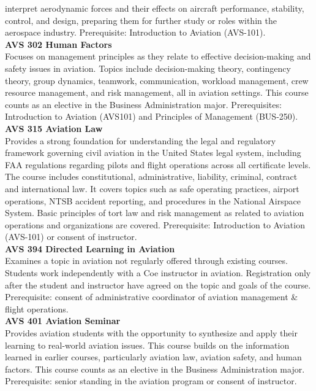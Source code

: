 \documentclass[
  letterpaper,
]{scrbook}
\begin{document}
interpret aerodynamic forces and their effects on aircraft performance,
stability, control, and design, preparing them for further study or
roles within the aerospace industry. Prerequisite: Introduction to
Aviation (AVS-101).\\
\textbf{AVS 302 Human Factors}\\
Focuses on management principles as they relate to effective
decision-making and safety issues in aviation. Topics include
decision-making theory, contingency theory, group dynamics, teamwork,
communication, workload management, crew resource management, and risk
management, all in aviation settings. This course counts as an elective
in the Business Administration major. Prerequisites: Introduction to
Aviation (AVS101) and Principles of Management (BUS-250).\\
\textbf{AVS 315 Aviation Law}\\
Provides a strong foundation for understanding the legal and regulatory
framework governing civil aviation in the United States legal system,
including FAA regulations regarding pilots and flight operations across
all certificate levels. The course includes constitutional,
administrative, liability, criminal, contract and international law. It
covers topics such as safe operating practices, airport operations, NTSB
accident reporting, and procedures in the National Airspace System.
Basic principles of tort law and risk management as related to aviation
operations and organizations are covered. Prerequisite: Introduction to
Aviation (AVS-101) or consent of instructor.\\
\textbf{AVS 394 Directed Learning in Aviation}\\
Examines a topic in aviation not regularly offered through existing
courses. Students work independently with a Coe instructor in aviation.
Registration only after the student and instructor have agreed on the
topic and goals of the course. Prerequisite: consent of administrative
coordinator of aviation management \& flight operations.\\
\textbf{AVS 401 Aviation Seminar}\\
Provides aviation students with the opportunity to synthesize and apply
their learning to real-world aviation issues. This course builds on the
information learned in earlier courses, particularly aviation law,
aviation safety, and human factors. This course counts as an elective in
the Business Administration major. Prerequisite: senior standing in the
aviation program or consent of instructor.\\
\end{document}
